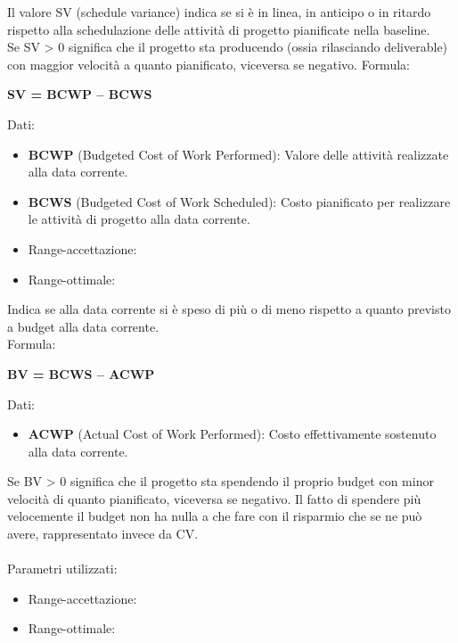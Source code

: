 \documentclass[a4paper,11pt]{article}
\begin{document}
\begin{itemize}
Il valore SV (schedule variance) indica se si è in linea, in anticipo o in ritardo rispetto alla schedulazione delle attività di progetto pianificate nella baseline.\\
Se SV > 0 significa che il progetto sta producendo (ossia rilasciando deliverable) con maggior velocità a quanto pianificato, viceversa se negativo.
Formula:
\begin{center}
\textbf{SV = BCWP – BCWS\\}
\end{center}
Dati:
\begin{itemize}
\item \textbf{BCWP} (Budgeted Cost of Work Performed): Valore delle attività realizzate alla data corrente.
\item \textbf{BCWS} (Budgeted Cost of Work Scheduled): Costo pianificato per realizzare le attività di progetto alla data corrente.
\end{itemize}
\begin{itemize}
	\item Range-accettazione: \begin{math} [ \ge -(PreventivoFase*5\%)]
	\end{math}
	\item Range-ottimale: \begin{math}[ \ge 0]\end{math}
	\end{itemize}

 Indica se alla data corrente si è speso di più o di meno rispetto a quanto previsto a budget alla data corrente.\\
Formula: 
\begin{center}
\textbf{BV = BCWS – ACWP}
\end{center}
Dati:
\begin{itemize}
\item \textbf{ACWP} (Actual Cost of Work Performed): Costo effettivamente sostenuto alla data corrente.
\end{itemize}
Se BV > 0 significa che il progetto sta spendendo il proprio budget con minor velocità di quanto pianificato, viceversa se negativo. Il fatto di spendere più velocemente il budget non ha nulla a che fare con il risparmio che se ne può avere, rappresentato invece da CV.\\\\
Parametri utilizzati: 
\begin{itemize}
	\item Range-accettazione: \begin{math}[ \ge -(PreventivoFase*10\%)]
	\end{math}
	\item Range-ottimale: \begin{math}[ \ge 0]\end{math}
	\end{itemize}
	

\end{itemize}
\end{document}
